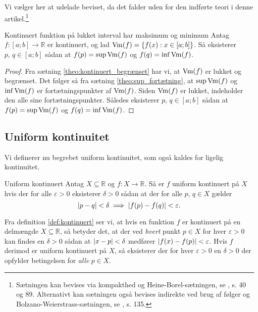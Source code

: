 Vi vælger her at udelade beviset, da det falder uden for den indførte teori i denne artikel.\footnote{Sætningen kan bevises via kompakthed og Heine-Borel-sætningen, se \cite{Rudin1976}, s. 40 og 89.
Alternativt kan sætningen også bevises indirekte ved brug af følger og Bolzano-Weierstrass-sætningen, se \cite{Bartle2010}, s. 135.}

\begin{theorem}[label=theo:kontinuert_maks]{Kontinuert funktion på lukket interval har maksimum og minimum}{}
  Antag $f:[a;b] \to \mathbb{R}$ er kontinuert, og lad $\operatorname{Vm}(f)=\{ f(x):x \in [a;b] \} $.
  Så eksisterer $p,\,q \in [a;b]$ sådan at $f(p)=\sup \operatorname{Vm}(f)$ og $f(q)=\inf \operatorname{Vm}(f)$.
\end{theorem}
\begin{proof} 
  Fra sætning \ref{theo:kontinuert_begrænset} har vi, at $\operatorname{Vm} (f)$ er lukket og begrænset. 
  Det følger så fra sætning \ref{theo:sup_fortætning}, at $\sup \operatorname{Vm} (f)$ og $\inf \operatorname{Vm} (f)$ er fortætningspunkter af $\operatorname{Vm} (f)$.
  Siden $\operatorname{Vm} (f)$ er lukket, indeholder den alle sine fortætningspunkter. 
  Således eksisterer $p,\,q \in [a;b]$ sådan at $f(p)=\sup \operatorname{Vm}(f)$ og $f(q)=\inf \operatorname{Vm}(f)$.
\end{proof}

\subsection{Uniform kontinuitet}%
  \label{sub:Uniform kontinuitet}

Vi definerer nu begrebet uniform kontinuitet, som også kaldes for ligelig kontinuitet.

\begin{definition}[label=def:uniform_kontinuert]{Uniform kontinuert}{}
  Antag $X \subseteq \mathbb{R}$ og $f:X \to \mathbb{R}$. 
  Så er $f$ uniform kontinuert på $X$ hvis der for alle $\varepsilon >0$ eksisterer $\delta >0$ sådan at der for alle $p,\,q \in X$ gælder
  \[
  \abs{p-q} < \delta \implies \abs{f(p)-f(q)}<\varepsilon.  
  \] 
\end{definition}

Fra definition \ref{def:kontinuert} ser vi, at hvis en funktion $f$ er kontinuert på en delmængde $X \subseteq \mathbb{R}$, så betyder det, at der ved \textit{hvert} punkt $p \in X$ for hver $\varepsilon >0$ kan findes en $\delta >0$ sådan at $\abs{x-p} <\delta $ medfører $\abs{f(x)-f(p)} < \varepsilon  $.
Hvis $f$ derimod er uniform kontinuert på $X$, så eksisterer der for hver $\varepsilon >0$ en $\delta >0$ der opfylder betingelsen for \textit{alle} $p \in X$. 

